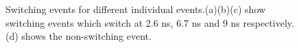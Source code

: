 \begin{figure}[!ht]
\centering
{}
\caption{Switching events for different individual events.(a)(b)(c) show switching events which switch at 2.6 ns, 6.7 ns and 9 ns respectively. (d) shows the non-switching event. }
\end{figure}

